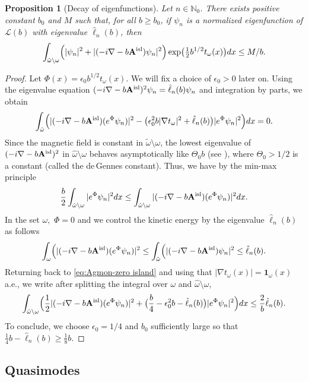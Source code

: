 \documentclass[11pt]{amsart}
\newtheorem{proposition}[theorem]{Proposition}
\theoremstyle{remark}
\newcommand{\bA}{\mathbf{A}}
\numberwithin{equation}{section}
\begin{document}
\begin{proposition}[Decay of eigenfunctions]\label{prop:dec-ef-zero island}
    Let $n\in\mathbb N_0$. There exists positive constant $b_0$ and $M$ such that, for all $b\geq b_0$, if $\psi_n$ is a normalized eigenfunction of $\mathcal L(b)$ with eigenvalue $\hat\ell_n(b)$, then
    \[\int_{\hat\omega\setminus\omega} \Bigl(|\psi_n|^2+|(-i\nabla-b\bA^{\rm isl})\psi_n|^2\Bigr)\exp\bigl(\mbox{$\frac12$} b^{1/2}t_\omega(x)\bigr)dx\leq M/b.\]
\end{proposition}
\begin{proof}
Let $\Phi(x)=\epsilon_0 b^{1/2}t_\omega(x)$. We will fix a choice of $\epsilon_0>0$ later on. Using the eigenvalue equation $(-i\nabla-b\bA^{\rm isl})^2\psi_n=\hat\ell_n(b)\psi_n$ and integration by parts, we obtain
\begin{equation}\label{eq:Agmon-zero island}\int_{\hat\omega}\Bigl(|(-i\nabla-b\bA^{\rm isl})(e^{\Phi}\psi_n)|^2- \bigl(\epsilon_0^2b|\nabla t_\omega|^2+\hat\ell_n(b) \bigr)|e^{\Phi}\psi_n|^2\Bigr)dx=0.
\end{equation}
%
Since the magnetic field is constant in $\tilde\omega\setminus\omega$, the lowest eigenvalue of $(-i\nabla-b\bA^{\rm isl})^2$ in $\hat\omega\setminus\omega$ behaves asymptotically like $\Theta_0b$ (see \cite[Theorem~8.11]{FH-b}), where $\Theta_0>1/2$ is a constant (called the de\,Gennes constant). Thus, we have by the min-max principle
\[\frac{b}{2}\int_{\hat\omega\setminus\omega}|e^{\Phi}\psi_n|^2dx\leq \int_{\hat\omega\setminus\omega}|(-i\nabla-b\bA^{\rm isl})(e^{\Phi}\psi_n)|^2dx. \]
%
In the set $\omega,$ $\Phi=0$ and we control the kinetic energy by the eigenvalue $\hat\ell_n(b)$ as follows
\[\int_{\omega}\Bigl(|(-i\nabla-b\bA^{\rm isl})(e^{\Phi}\psi_n)|^2\leq \int_{\hat\omega}\Bigl(|(-i\nabla-b\bA^{\rm isl})\psi_n|^2\leq \hat\ell_n(b).\]
%
Returning back to \eqref{eq:Agmon-zero island} and using that $|\nabla t_\omega(x)|=\mathbf 1_{\omega}(x)$ a.e., we write after splitting the integral over $\omega$ and $\hat\omega\setminus\omega$,
\[\int_{\hat\omega\setminus\omega}\Bigl(\frac12|(-i\nabla-b\bA^{\rm isl})(e^{\Phi}\psi_n)|^2+\bigl(\frac{b}{4}-\epsilon_0^2b-\hat\ell_n(b) \bigr)|e^{\Phi}\psi_n|^2\Bigr)dx\leq \frac{2}{b}\hat\ell_n(b).\]
To conclude, we choose $\epsilon_0=1/4$ and $b_0$ sufficiently large so that $\frac14b-\hat\ell_n(b)\geq \frac18 b$.
\end{proof}
%
\subsection{Quasimodes}
\end{document}
